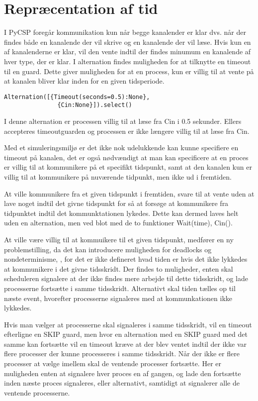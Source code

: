 \section{Repræcentation af tid}
I PyCSP foregår kommunikation kun når begge kanalender er klar dvs.
når der findes både en kanalende der vil skrive og en kanalende der vil læse. 
Hvis kun en af kanalenderne er klar, vil den vente indtil
der findes minumum en kanalende af hver type, der er klar. I alternation 
findes muligheden for at tilknytte en timeout til en guard. Dette
giver muligheden for at en process, kun er villig til at vente på at kanalen 
bliver klar inden for en given tidsperiode. 
\begin{lstlisting}[label=Timeout,
  caption=Timeout i Alternation (fra dokumentationen til PyCSP)]
  Alternation([{Timeout(seconds=0.5):None},
               {Cin:None}]).select()
\end{lstlisting} 

I denne alternation er processen villig til at læse fra Cin i 0.5 sekunder. 
Ellers accepteres timeoutguarden og processen er ikke længere villig til at 
læse fra Cin.

Med et simuleringsmiljø er det ikke nok udelukkende kan kunne specifiere en 
timeout på kanalen, det er også nødvændigt at man kan specificere at en proces 
er villig til at kommunikere på et specifikt tidspunkt, samt at den kanalen 
kun er villig til at kommunikere på nuværende tidpunkt, men ikke ud 
i fremtiden. 

At ville kommunikere fra et given tidspunkt i fremtiden,  svare til at vente 
uden at lave noget indtil det givne tidspunkt for så at forsøge at kommunikere 
fra tidpunktet indtil det kommunktationen lykedes. Dette kan dermed laves helt 
uden en alternation, men ved blot med de to funktioner Wait(time), Cin(). 

At ville være villig til at kommuikere til et given tidspunkt, medfører en ny 
problemstilling, da det kan introducere muligheden for deadlocks og 
nondeterminisme, , for det er ikke defineret hvad 
tiden er hvis det ikke lykkedes at kommunikere i det givne tidsskridt. Der 
findes to muligheder, enten skal scheduleren signalere at der ikke findes mere 
arbejde til dette tidsskridt, og lade processerne fortsætte i samme 
tidsskridt. Alternativt skal tiden tælles op til næste event, hvorefter 
processerne signaleres med at kommunkationen ikke lykkedes. 

Hvis man vælger at processerne skal signaleres i samme tidsskridt, vil en 
timeout efterligne en SKIP guard, men hvor en alternation med en SKIP guard 
med det samme kan fortsætte vil en timeout kræve at der blev ventet indtil der 
ikke var flere processer der kunne processeres i samme tidsskridt. Når der 
ikke er flere processer at vælge imellem skal de ventende processer fortsætte. 
Her er muligheden enten at signalere hver proces en af gangen, og lade den 
fortsætte inden næste proces signaleres, eller alternativt, samtidigt at 
signalerer alle de ventende processerne.


